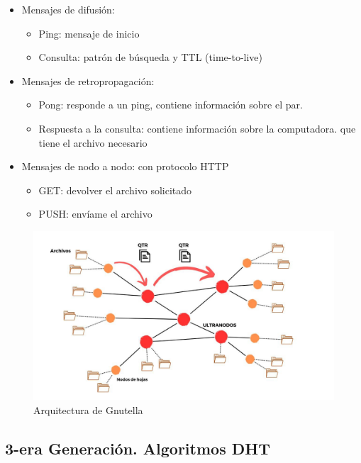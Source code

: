  \begin{itemize}
 		\item Mensajes de difusión:  		
 		\begin{itemize}
 			\item  Ping: mensaje de inicio 
 			\item Consulta: patrón de búsqueda y TTL (time-to-live)  
 		\end{itemize}
 		
 			\item Mensajes de retropropagaci\'on: 
 				\begin{itemize}
 				\item Pong: responde a un ping, contiene información sobre el par.
 				\item Respuesta a la consulta: contiene información sobre la computadora.
 				que tiene el archivo necesario
 			\end{itemize}
 			
 			
 			\item Mensajes de nodo a nodo: con protocolo HTTP 
 			\begin{itemize}
 				\item GET: devolver el archivo solicitado
 				\item PUSH: envíame el archivo
 			\end{itemize}
 \end{itemize}

 
 	 
   
  	
  	\begin{figure}%
  				\begin{center}
  			\includegraphics[width=0.8\linewidth] {10/2.jpg } 
  		\caption{Arquitectura de Gnutella}
  		\label{fig:gnutella}
  				\end{center}
  	\end{figure}
 
 \subsection{3-era Generación. Algoritmos DHT}  
  

